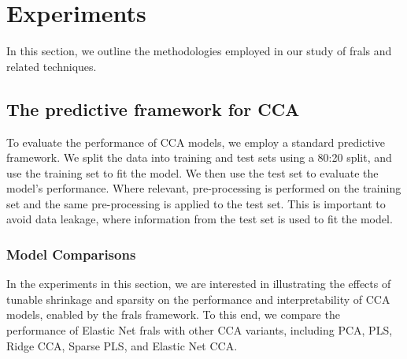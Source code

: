 \section{Experiments}

In this section, we outline the methodologies employed in our study of \acrshort{frals} and related techniques.

\subsection{The predictive framework for CCA}\label{subsec:the-predictive-framework-for-cca}

To evaluate the performance of CCA models, we employ a standard predictive framework.
We split the data into training and test sets using a 80:20 split, and use the training set to fit the model.
We then use the test set to evaluate the model's performance.
Where relevant, pre-processing is performed on the training set and the same pre-processing is applied to the test set.
This is important to avoid data leakage, where information from the test set is used to fit the model.

\subsubsection{Model Comparisons}
In the experiments in this section, we are interested in illustrating the effects of tunable shrinkage and sparsity on the performance and interpretability of CCA models, enabled by the \acrshort{frals} framework.
To this end, we compare the performance of Elastic Net \acrshort{frals} with other CCA variants, including PCA, PLS, Ridge CCA, Sparse PLS, and Elastic Net CCA\@.

